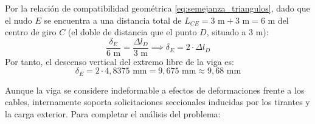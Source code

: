 Por la relación de compatibilidad geométrica \eqref{eq:semejanza_triangulos}, dado que el nudo $E$ se encuentra a una distancia total de $L_{CE} = 3\text{ m} + 3\text{ m} = 6\text{ m}$ del centro de giro $C$ (el doble de distancia que el punto $D$, situado a $3\text{ m}$):
\begin{equation}
    \frac{\delta_E}{6\text{ m}} = \frac{\Delta l_D}{3\text{ m}} \implies \delta_E = 2 \cdot \Delta l_D
\end{equation}
Por tanto, el descenso vertical del extremo libre de la viga es:
\begin{equation}
    \boxed{\delta_E = 2 \cdot 4{,}8375\text{ mm} = 9{,}675\text{ mm} \approx 9{,}68\text{ mm}}
\end{equation}



Aunque la viga se considere indeformable a efectos de deformaciones frente a los cables, internamente soporta solicitaciones seccionales inducidas por los tirantes y la carga exterior. Para completar el análisis del problema:

